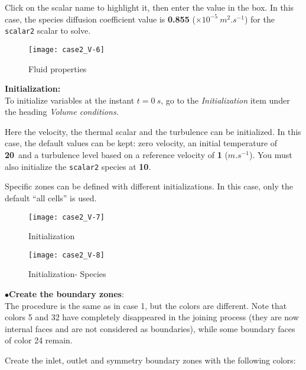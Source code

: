 Click on the scalar name to highlight it, then enter the value in the box.
In this case, the species diffusion coefficient value is {\bf 0.855} ($\times 10^{-5}\ m^{2}.s^{-1}$)
for the \texttt{scalar2} scalar to solve.

\begin{figure}[h!]
\begin{center}
\texttt{[image: case2\_V-6]}
\caption{Fluid properties}
\label{fig9_e2}
\end{center}
\end{figure}

\newpage
\textbf{Initialization:}\\
To initialize variables at the instant $t=0\ s$, go to the {\itshape Initialization}
item under the heading {\itshape Volume conditions}.

Here the velocity, the thermal scalar and the turbulence can be initialized.
In this case, the default values can be kept: zero velocity, an initial temperature of
{\bf 20}\degresC\  and a turbulence level based on a reference velocity of {\bf 1} ($m.s^{-1}$).
You must also initialize the \texttt{scalar2} species at {\bf 10}\degresC.

Specific zones can be defined with different initializations. In this case, only the
default ``all cells'' is used.
\begin{figure}[h!]
\begin{center}
\texttt{[image: case2\_V-7]}
\caption{Initialization}
\label{fig9_e2}
\end{center}
\end{figure}
\newpage
\begin{figure}[h!]
\begin{center}
\texttt{[image: case2\_V-8]}
\caption{Initialization- Species}
\label{fig9_e2}
\end{center}
\end{figure}

\newpage
$\bullet${\bf Create the boundary zones}:\\
The procedure is the same as in case 1, but the colors are different.
Note that colors 5 and 32 have completely disappeared in the joining process
(they are now internal faces and are not considered as boundaries), while some
boundary faces of color 24 remain.

Create the inlet, outlet and symmetry boundary zones with the following colors:\\

